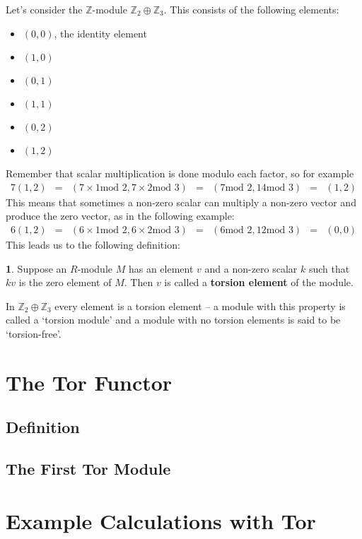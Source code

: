 \documentclass[oneside,english]{amsbook}
\numberwithin{section}{chapter}
\theoremstyle{plain}
\theoremstyle{definition}
\newtheorem{defn}[thm]{\protect\definitionname}
\providecommand{\definitionname}{Definition}
\begin{document}
			Let's consider the $\mathbb{Z}$-module $\mathbb{Z}_2\oplus\mathbb{Z}_3$. This consists of the following elements:
			\begin{itemize}
				\item $(0, 0)$, the identity element
				\item$(1, 0)$
				\item$(0, 1)$
				\item$(1, 1)$
				\item$(0, 2)$
				\item$(1, 2)$
			\end{itemize}
			Remember that scalar multiplication is done modulo each factor, so for example
			\begin{align}[rcl]
				7(1, 2) &=& (7\times 1 \text{mod 2}, 7\times 2 \text{mod 3})
				 &=& (7 \text{mod 2}, 14 \text{mod 3})
				 &=& (1, 2)
			\end{align}
			This means that sometimes a non-zero scalar can multiply a non-zero vector and produce the zero vector, as in the following example:
			\begin{align}[rcl]
				6(1, 2) &=& (6\times 1 \text{mod 2}, 6\times 2 \text{mod 3})
				 &=& (6 \text{mod 2}, 12 \text{mod 3})
				&=& (0, 0)
			\end{align}
			This leads us to the following definition:
			\begin{defn}
				Suppose an $R$-module $M$ has an element $v$ and a non-zero scalar $k$ such that $kv$ is the zero element of $M$. Then $v$ is called a \textbf{torsion element} of the module.
			\end{defn}
			In $\mathbb{Z}_2\oplus\mathbb{Z}_3$ every element is a torsion element -- a module with this property is called a `torsion module' and a module with no torsion elements is said to be `torsion-free'.

		\section{The Tor Functor}

			\subsection{Definition}

			\subsection{The First Tor Module}

		\section{Example Calculations with Tor}
\end{document}
